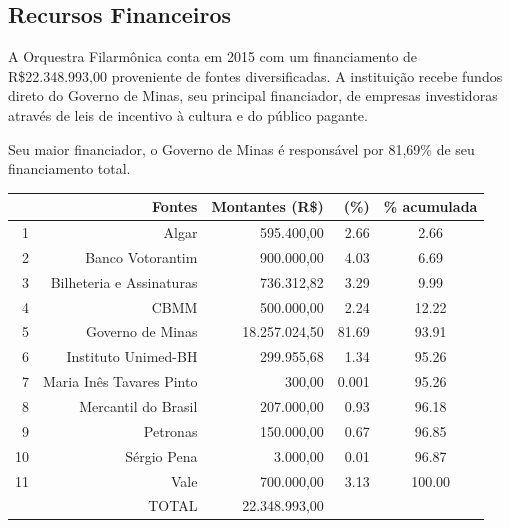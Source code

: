 \documentclass[a4paper, 12pt, openright, oneside, german, french, english, brazil]{abntex2}
\begin{document}
	\subsection{Recursos Financeiros}
	
	A Orquestra Filarmônica conta em 2015 com um financiamento de R\$22.348.993,00 proveniente de fontes diversificadas. A instituição recebe fundos direto do Governo de Minas, seu principal financiador, de empresas investidoras através de leis de incentivo à cultura e do público pagante.
	
			
	
	Seu maior financiador, o Governo de Minas é responsável por 81,69\% de seu financiamento total. 
	
	\begin{table}[ht]
		{\begin{tabular}{rrrrc}
				\hline
				& Fontes & Montantes (R\$) & (\%) & \% acumulada \\ 
				\hline
				1 & Algar & 595.400,00 & 2.66 & 2.66 \\ 
				2 & Banco Votorantim & 900.000,00 & 4.03 & 6.69 \\ 
				3 & Bilheteria e Assinaturas & 736.312,82 & 3.29 & 9.99 \\ 
				4 & CBMM & 500.000,00 & 2.24 & 12.22 \\ 
				5 & Governo de Minas & 18.257.024,50 & 81.69 & 93.91 \\ 
				6 & Instituto Unimed-BH & 299.955,68 & 1.34 & 95.26 \\ 
				7 & Maria Inês Tavares Pinto & 300,00 & 0.001 & 95.26 \\ 
				8 & Mercantil do Brasil & 207.000,00 & 0.93 & 96.18 \\ 
				9 & Petronas & 150.000,00 & 0.67 & 96.85 \\ 
				10 & Sérgio Pena & 3.000,00 & 0.01 & 96.87 \\ 
				11 & Vale & 700.000,00 & 3.13 & 100.00 \\ 
				\hline
				& TOTAL & 22.348.993,00 &  & \\
				\hline 
			\end{tabular}
		}
		{
		}
	\end{table}
	
\end{document}
